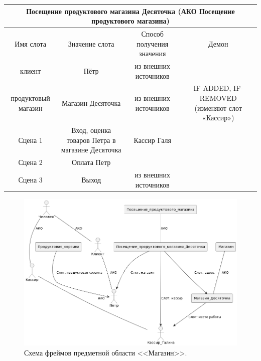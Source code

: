 \documentclass[14pt, a4paper, titlepage]{extarticle}
\begin{document}
\begin{table}[H]
	\begin{adjustbox}{width=\columnwidth,center}
		\begin{tabular}{cccc}
			\toprule
			\multicolumn{4}{c}{Посещение продуктового магазина Десяточка (АКО Посещение продуктового магазина)} \\
			\midrule
			Имя слота & Значение слота & Способ получения значения & Демон
			\\\midrule
			
			клиент & Пётр & из внешних источников & \\
			продуктовый магазин & Магазин Десяточка & из внешних источников & IF-ADDED, IF-REMOVED (изменяют слот «Кассир») \\
			Сцена 1 & Вход, оценка товаров Петра в магазине Десяточка & Кассир Галя & \\
			Сцена 2 & Оплата Петр & & \\
			Сцена 3 & Выход & из внешних источников & \\
			
			\bottomrule
		\end{tabular}
	\end{adjustbox}
\end{table}

\begin{figure}[H]
	\includegraphics[width=\textwidth]{pic3}
	\caption{Схема фреймов предметной области <<Магазин>>.}
\end{figure}
\end{document}
